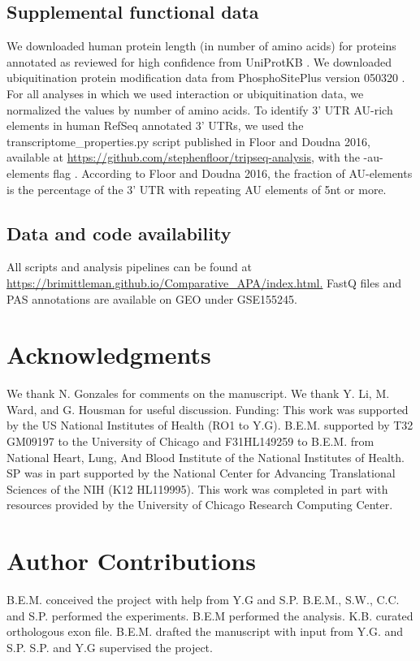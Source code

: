 \subsection{Supplemental functional data}\label{supFunc}

We downloaded human protein length (in number of amino acids) for proteins annotated as reviewed for high confidence from UniProtKB \citep{the_uniprot_consortium_uniprot_2019}. We downloaded ubiquitination protein modification data from PhosphoSitePlus version 050320 \citep{hornbeck_phosphositeplus_2015}. For all analyses in which we used interaction or ubiquitination data, we normalized the values by number of amino acids. To identify 3' UTR AU-rich elements in human RefSeq annotated 3' UTRs, we used the transcriptome\_properties.py script published in Floor and Doudna 2016, available at \url{https://github.com/stephenfloor/tripseq-analysis}, with the -au-elements flag \citep{floor_tunable_2016-1}. According to Floor and Doudna 2016, the fraction of AU-elements is the percentage of the 3' UTR with repeating AU elements of 5nt or more\citep{floor_tunable_2016-1}.

\subsection{Data and code
availability}\label{ch03-data-and-code-availability} All scripts and analysis pipelines can be found at \url{https://brimittleman.github.io/Comparative_APA/index.html.} FastQ files and PAS annotations are available on GEO under GSE155245. 

\section{Acknowledgments}\label{ch03-acknowledgments}
We thank N. Gonzales for comments on the manuscript. We thank Y. Li, M. Ward, and G. Housman for useful discussion.  Funding: This work was supported by the US National Institutes of Health (RO1 to Y.G). B.E.M. supported by T32 GM09197 to the University of Chicago and F31HL149259 to B.E.M. from National Heart, Lung, And Blood Institute of the National Institutes of Health. SP was in part supported by the National Center for Advancing Translational Sciences of the NIH (K12 HL119995). This work was completed in part with resources provided by the University of Chicago Research Computing Center.
 
\section{Author Contributions}\label{ch03-author-contributions}
B.E.M. conceived the project with help from Y.G and S.P. B.E.M., S.W., C.C. and S.P. performed the experiments. B.E.M performed the analysis. K.B. curated orthologous exon file. B.E.M. drafted the manuscript with input from Y.G. and S.P. S.P. and Y.G supervised the project.


